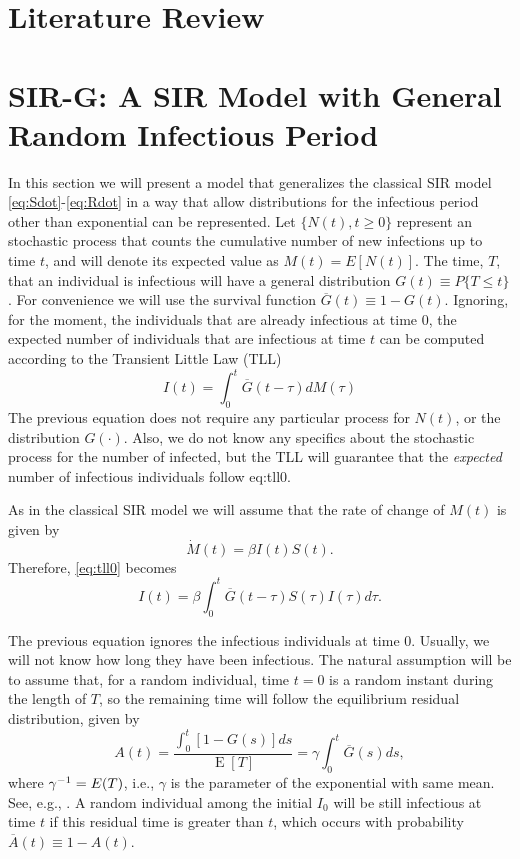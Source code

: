 \documentclass[twoside,USenglish,10pt]{article}
\newcommand{\Ab}{\overline{A}\xspace}
\newcommand{\Gb}{\overline{G}\xspace}
\newcommand{\gami}{\ensuremath\gamma^{-1}\xspace}
\DeclareMathOperator{\Exp}{E}       %
\begin{document}
\section{Literature Review}\label{sc:litrev}



\section{SIR-G: A SIR Model with General Random Infectious Period}\label{sc:model}

In this section we will present a model that generalizes the classical SIR model \eqref{eq:Sdot}-\eqref{eq:Rdot} in a way that allow distributions for the infectious period other than exponential can be represented.
Let $\{N(t),t\geq 0\}$ represent an stochastic process that counts the cumulative number of new infections up to time $t$, and will denote its expected value as $M(t)=E[N(t)]$. 
The time, $T$, that an individual is infectious will have a general distribution $G(t)\equiv P\{T\leq t\}$.
For convenience we will use the survival function $\Gb(t) \equiv 1-G(t)$. Ignoring, for the moment, the individuals that are already infectious at time $0$, the expected number of individuals that are infectious at time $t$ can be computed according to the Transient Little Law (TLL) \cite{fral.ea:tll} 
\begin{equation}
	I(t) = \int_0^t \Gb(t-\tau) dM(\tau)   \label{eq:tll0}
\end{equation} 
The previous equation does not require any particular process for $N(t)$, or the distribution $G(\cdot)$. Also, we do not know any specifics about the stochastic process for the number of infected, but the TLL will guarantee that the  \textit{expected} number of infectious individuals follow {eq:tll0}.

As in the classical SIR model we will assume that the rate of change of $M(t)$ is given by
\begin{equation}
\dot{M}(t) = \beta I(t)S(t).
\label{eq:dM}
\end{equation}
Therefore, \eqref{eq:tll0} becomes
\begin{equation}
	I(t) = \beta\int_0^t \Gb(t-\tau) S(\tau)I(\tau)d\tau.   \label{eq:tll}
\end{equation}

The previous equation ignores the infectious individuals at time 0. Usually, we will not know how long they have been infectious. The natural assumption will be to assume that, for a random individual, time $t=0$ is a random instant during the length of $T$, so the remaining time will follow the equilibrium residual distribution, given by
\begin{equation}
	A(t) =  \frac{\int_0^t[1-G(s)]ds}{\Exp{[T]}} = \gamma \int_0^t \Gb(s)ds,
\label{eq:eqdist}
\end{equation}
where $\gami=E(T)$, i.e., $\gamma$ is the parameter of the exponential with same mean. See, e.g., \cite{kulk95}. A random individual among the initial $I_0$ will be still infectious at time $t$ if this residual time is greater than $t$, which occurs with probability $\Ab(t)\equiv 1- A(t)$. 
\end{document}
